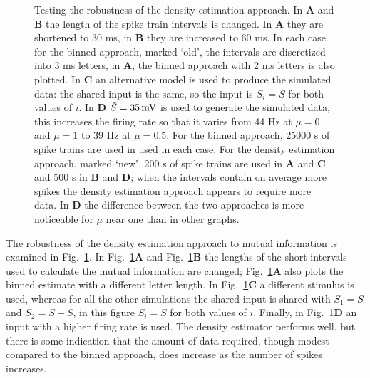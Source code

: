 \documentclass[12pt]{article}
\newcommand{\mV}{\mbox{\,mV}}
\begin{document}
\begin{figure}[tp]
\begin{center}
\begin{picture}
  \end{picture}%
\endgroup
\end{center}
\caption{Testing the robustness of the density estimation approach. In
  \textbf{A} and \textbf{B} the length of the spike train intervals is
  changed. In \textbf{A} they are shortened to 30 ms, in \textbf{B}
  they are increased to 60 ms. In each case for the binned approach,
  marked \lq{}old\rq{}, the intervals are discretized into 3 ms
  letters, in \textbf{A}, the binned approach with 2 ms letters is
  also plotted. In \textbf{C} an alternative model is used to produce
  the simulated data: the shared input is the same, so the input is
  $S_i=S$ for both values of $i$. In \textbf{D} $\bar{S}=35\mV$ is
  used to generate the simulated data, this increases the firing rate
  so that it varies from 44 Hz at $\mu=0$ and $\mu=1$ to 39 Hz at
  $\mu=0.5$. For the binned approach, 25000 s of spike trains are used
  in used in each case.  For the density estimation approach, marked
  \lq{}new\rq{}, 200 s of spike trains are used in \textbf{A} and
  \textbf{C} and 500 s in \textbf{B} and \textbf{D}; when the
  intervals contain on average more spikes the density estimation
  approach appears to require more data. In \textbf{D} the difference
  between the two approaches is more noticeable for $\mu$ near one
  than in other graphs. \label{fig_different_mu_sweeps}}
\end{figure}



The robustness of the density estimation approach to mutual
information is examined in Fig.~\ref{fig_different_mu_sweeps}. In
Fig.~\ref{fig_different_mu_sweeps}\textbf{A} and
Fig.~\ref{fig_different_mu_sweeps}\textbf{B} the lengths of the short intervals
used to calculate the mutual information are changed;
Fig.~\ref{fig_different_mu_sweeps}\textbf{A} also plots the binned
estimate with a different letter length. In
Fig.~\ref{fig_different_mu_sweeps}\textbf{C} a different stimulus is
used, whereas for all the other simulations the
shared input is shared with $S_1=S$ and $S_2=\bar{S}-S$, in this
figure $S_i=S$ for both values of $i$. Finally, in
Fig.~\ref{fig_different_mu_sweeps}\textbf{D} an input with a higher
firing rate is used. The density estimator performs well, but there is
some indication that the amount of data required, though modest
compared to the binned approach, does increase as the number of spikes
increases.
\end{document}
